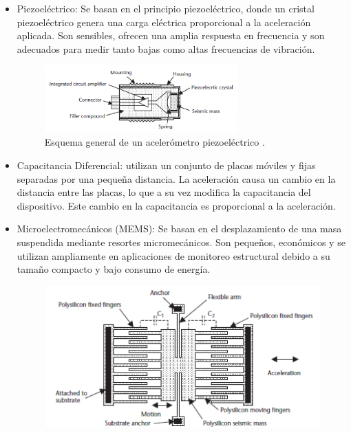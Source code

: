 \begin{itemize}
        \begin{itemize}
            \item Piezoeléctrico: Se basan en el principio piezoeléctrico, donde un cristal piezoeléctrico genera una carga eléctrica proporcional a la aceleración aplicada. Son sensibles, ofrecen una amplia respuesta en frecuencia y son adecuados para medir tanto bajas como altas frecuencias de vibración. 
            \begin{figure}[H]
                \centering
                \includegraphics[width = 0.7\textwidth]{imagenes/cap1_marcoteo/AccelerometerPiezo.png}
                \caption{Esquema general de un acelerómetro piezoeléctrico \citep{dunn2005introduction}.}
                \label{fig:acc-pie}
            \end{figure}
            \item Capacitancia Diferencial: utilizan un conjunto de placas móviles y fijas separadas por una pequeña distancia. La aceleración causa un cambio en la distancia entre las placas, lo que a su vez modifica la capacitancia del dispositivo. Este cambio en la capacitancia es proporcional a la aceleración.
            \item Microelectromecánicos (MEMS): Se basan en el desplazamiento de una masa suspendida mediante resortes micromecánicos. Son pequeños, económicos y se utilizan ampliamente en aplicaciones de monitoreo estructural debido a su tamaño compacto y bajo consumo de energía.
            \begin{figure}[H]
                \centering
                \begin{minipage}{0.45\textwidth}
                    \centering
                    \includegraphics[width=1\textwidth]{imagenes/cap1_marcoteo/AccelerometerMEMS.png}

\end{minipage}
\end{figure}
\end{itemize}
\end{itemize}
